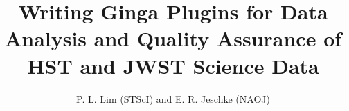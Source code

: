\documentclass[]{article}
\def\mypaperwidth{27.83in} \def\mypaperheight{39.37in}     %
\def\mydblmargin{\dimen87}
\begin{document}
\setlength{\textwidth}{\mypaperwidth-\mydblmargin}
\setlength{\textheight}{\mypaperheight-\mydblmargin}

\setlength{\hoffset}{-1.0in}
\setlength{\voffset}{-1.0in}

\setlength{\marginparwidth}{0in}
\setlength{\marginparsep}{0in}

\setlength{\footskip}{1em}

\setlength\headheight{0in}
\setlength\headsep{1em}

\setlength{\topmargin}{0.0in}
\setlength{\oddsidemargin}{1in}
\setlength{\evensidemargin}{1in}

\newcommand{\para}{\vspace*{1em}}

\title{Writing Ginga Plugins for Data Analysis and Quality Assurance of
            HST and JWST Science Data}
\author{P. L. Lim (STScI) and E. R. Jeschke (NAOJ)}

\setlength{\parindent}{0in}
\setlength{\parskip}{0pt}

\raggedright


\pagestyle{empty}
\end{document}
